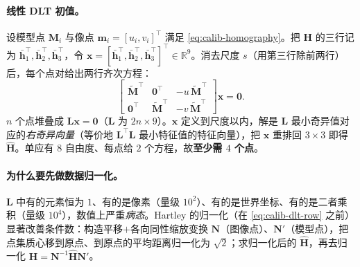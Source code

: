 \paragraph{线性 DLT 初值。}
设模型点 $\mathbf{M}_i$ 与像点 $\mathbf{m}_i=[u_i,v_i]^\top$ 满足 \cref{eq:calib-homography}。把 $\mathbf{H}$ 的三行记为 $\bar{\mathbf{h}}_1^\top,\bar{\mathbf{h}}_2^\top,\bar{\mathbf{h}}_3^\top$，令 $\mathbf{x}=[\bar{\mathbf{h}}_1^\top,\bar{\mathbf{h}}_2^\top,\bar{\mathbf{h}}_3^\top]^\top\in\mathbb{R}^9$。消去尺度 $s$（用第三行除前两行）后，每个点对给出两行齐次方程\cite{zhang2000calibration}：
\begin{equation}
  \begin{bmatrix} \tilde{\mathbf{M}}^\top & \mathbf{0}^\top & -u\,\tilde{\mathbf{M}}^\top\\
                  \mathbf{0}^\top & \tilde{\mathbf{M}}^\top & -v\,\tilde{\mathbf{M}}^\top\end{bmatrix}\mathbf{x}=\mathbf{0}.
  \label{eq:calib-dlt-row}
\end{equation}
$n$ 个点堆叠成 $\mathbf{L}\mathbf{x}=\mathbf{0}$（$\mathbf{L}$ 为 $2n\times9$）。$\mathbf{x}$ 定义到尺度以内，解是 $\mathbf{L}$ 最小奇异值对应的\emph{右奇异向量}（等价地 $\mathbf{L}^\top\mathbf{L}$ 最小特征值的特征向量），把 $\mathbf{x}$ 重排回 $3\times3$ 即得 $\hat{\mathbf{H}}$。单应有 $8$ 自由度、每点给 $2$ 个方程，故\textbf{至少需 $4$ 个点}\cite{stachniss2021zhang}。

\paragraph{为什么要先做数据归一化。}
$\mathbf{L}$ 中有的元素恒为 $1$、有的是像素（量级 $10^2$）、有的是世界坐标、有的是二者乘积（量级 $10^4$），数值上严重\emph{病态}。Hartley\cite{hartley1995defence} 的归一化（在 \cref{eq:calib-dlt-row} 之前）显著改善条件数：构造平移$+$各向同性缩放变换 $\mathbf{N}$（图像点）、$\mathbf{N}'$（模型点），把点集质心移到原点、到原点的平均距离归一化为 $\sqrt2$；求归一化后的 $\hat{\mathbf{H}}$，再去归一化 $\mathbf{H}=\mathbf{N}^{-1}\hat{\mathbf{H}}\mathbf{N}'$。

